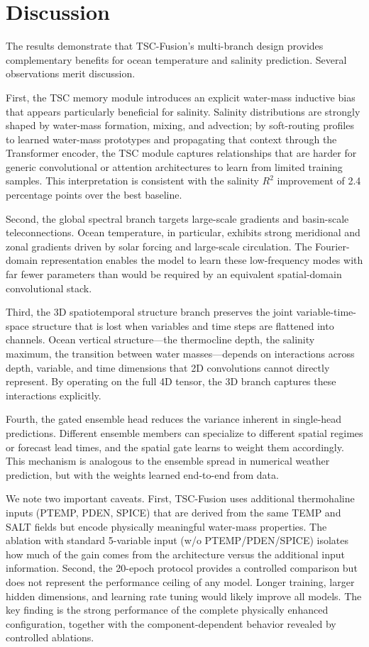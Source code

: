 \documentclass[conference]{IEEEtran}
\begin{document}
\section{Discussion}

The results demonstrate that TSC-Fusion's multi-branch design provides complementary benefits for ocean temperature and salinity prediction. Several observations merit discussion.

First, the TSC memory module introduces an explicit water-mass inductive bias that appears particularly beneficial for salinity. Salinity distributions are strongly shaped by water-mass formation, mixing, and advection; by soft-routing profiles to learned water-mass prototypes and propagating that context through the Transformer encoder, the TSC module captures relationships that are harder for generic convolutional or attention architectures to learn from limited training samples. This interpretation is consistent with the salinity $R^2$ improvement of 2.4 percentage points over the best baseline.

Second, the global spectral branch targets large-scale gradients and basin-scale teleconnections. Ocean temperature, in particular, exhibits strong meridional and zonal gradients driven by solar forcing and large-scale circulation. The Fourier-domain representation enables the model to learn these low-frequency modes with far fewer parameters than would be required by an equivalent spatial-domain convolutional stack.

Third, the 3D spatiotemporal structure branch preserves the joint variable-time-space structure that is lost when variables and time steps are flattened into channels. Ocean vertical structure---the thermocline depth, the salinity maximum, the transition between water masses---depends on interactions across depth, variable, and time dimensions that 2D convolutions cannot directly represent. By operating on the full 4D tensor, the 3D branch captures these interactions explicitly.

Fourth, the gated ensemble head reduces the variance inherent in single-head predictions. Different ensemble members can specialize to different spatial regimes or forecast lead times, and the spatial gate learns to weight them accordingly. This mechanism is analogous to the ensemble spread in numerical weather prediction, but with the weights learned end-to-end from data.

We note two important caveats. First, TSC-Fusion uses additional thermohaline inputs (PTEMP, PDEN, SPICE) that are derived from the same TEMP and SALT fields but encode physically meaningful water-mass properties. The ablation with standard 5-variable input (w/o PTEMP/PDEN/SPICE) isolates how much of the gain comes from the architecture versus the additional input information. Second, the 20-epoch protocol provides a controlled comparison but does not represent the performance ceiling of any model. Longer training, larger hidden dimensions, and learning rate tuning would likely improve all models. The key finding is the strong performance of the complete physically enhanced configuration, together with the component-dependent behavior revealed by controlled ablations.
\end{document}

